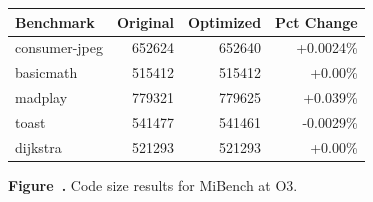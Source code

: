 \par\vspace{1.2em}

\begin{center}
{\normalfont\normalsize
\setlength{\tabcolsep}{5pt}
\renewcommand{\arraystretch}{1.08}
\begin{tabular}{@{}lrrr@{}}
\toprule
Benchmark & Original & Optimized & Pct Change \\
\midrule
consumer-jpeg & 652624 & 652640 & +0.0024\% \\
basicmath & 515412 & 515412 & +0.00\% \\
madplay & 779321 & 779625 & +0.039\% \\
toast & 541477 & 541461 & -0.0029\% \\
dijkstra & 521293 & 521293 & +0.00\% \\
\bottomrule
\end{tabular}
}
\end{center}

\vspace{0.12em}

\label{fig:figure15}

\begin{center}
\small\textbf{Figure~\thefigure.} Code size results for MiBench at O3.
\end{center}

\par\vspace{1.2em}
